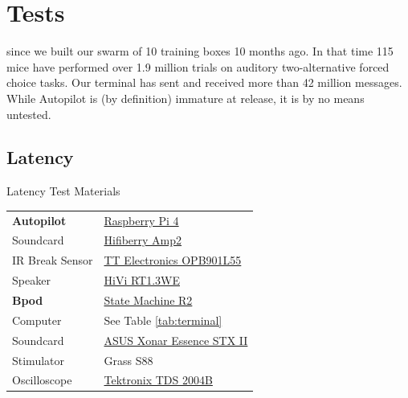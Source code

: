 \chapter{Tests}
\label{sec:tests}

 since we built our swarm of 10 training boxes 10 months ago. In that time 115 mice have performed over 1.9 million trials on auditory two-alternative forced choice tasks. Our terminal has sent and received more than 42 million messages. While Autopilot is (by definition) immature at release, it is by no means untested.

\section{Latency}
\label{sec:latency}

\begin{margintable}[1.5cm]
\caption{Latency Test Materials}
\label{tab:materials}
\noindent\begin{tabularx}{\linewidth}{lX}%
\toprule
\textbf{Autopilot} & \href{https://www.raspberrypi.org/products/raspberry-pi-4-model-b/}{Raspberry Pi 4}\\
Soundcard & \href{https://www.hifiberry.com/shop/boards/hifiberry-amp2/}{Hifiberry Amp2} \\
IR Break Sensor & \href{https://www.digikey.com/product-detail/en/tt-electronics-optek-technology/OPB901L55/365-1767-ND/1637490}{TT Electronics OPB901L55}\\
Speaker & \href{https://www.parts-express.com/hivi-rt13we-isodynamic-tweeter--297-421}{HiVi RT1.3WE}\\
\midrule
\textbf{Bpod} & \href{https://sanworks.io/shop/viewproduct?productID=1024}{State Machine R2}\\
Computer & See Table \ref{tab:terminal}\\
Soundcard & \href{https://www.asus.com/Sound-Cards/Essence_STX_II_71/}{ASUS Xonar Essence STX II}\\
Stimulator & Grass S88 \\
\midrule
Oscilloscope & \href{https://download.tek.com/manual/071181702web.pdf}{Tektronix TDS 2004B}\\
\bottomrule
\end{tabularx}
\end{margintable}


